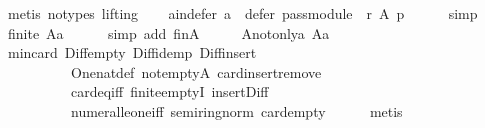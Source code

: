 \begin{isabellebody}
\ {\isacharparenleft}{\kern0pt}metis\ {\isacharparenleft}{\kern0pt}no{\isacharunderscore}{\kern0pt}types{\isacharcomma}{\kern0pt}\ lifting{\isacharparenright}{\kern0pt}{\isacharparenright}{\kern0pt}\isanewline
\ \ \isamarkupfalse%
\ a{\isacharunderscore}{\kern0pt}in{\isacharunderscore}{\kern0pt}defer{\isacharcolon}{\kern0pt}\ {\isachardoublequoteopen}a\ {\isasymin}\ defer\ {\isacharparenleft}{\kern0pt}pass{\isacharunderscore}{\kern0pt}module\ {}\ r{\isacharparenright}{\kern0pt}\ A\ p{\isachardoublequoteclose}\isanewline
\ \ \ \ \isamarkupfalse%
\ simp\isanewline
\ \ \isamarkupfalse%
\ {\isachardoublequoteopen}finite\ {\isacharparenleft}{\kern0pt}A{\isacharminus}{\kern0pt}{\isacharbraceleft}{\kern0pt}a{\isacharbraceright}{\kern0pt}{\isacharparenright}{\kern0pt}{\isachardoublequoteclose}\isanewline
\ \ \ \ \isamarkupfalse%
\ {\isacharparenleft}{\kern0pt}simp\ add{\isacharcolon}{\kern0pt}\ finA{\isacharparenright}{\kern0pt}\isanewline
\ \ \isamarkupfalse%
\ \isamarkupfalse%
\ A{\isacharunderscore}{\kern0pt}not{\isacharunderscore}{\kern0pt}only{\isacharunderscore}{\kern0pt}a{\isacharcolon}{\kern0pt}\ {\isachardoublequoteopen}A{\isacharminus}{\kern0pt}{\isacharbraceleft}{\kern0pt}a{\isacharbraceright}{\kern0pt}\ {\isasymnoteq}\ {\isacharbraceleft}{\kern0pt}{\isacharbraceright}{\kern0pt}{\isachardoublequoteclose}\isanewline
\ \ \ \ \isamarkupfalse%
\ min{\isacharunderscore}{\kern0pt}{}{\isacharunderscore}{\kern0pt}card\ Diff{\isacharunderscore}{\kern0pt}empty\ Diff{\isacharunderscore}{\kern0pt}idemp\ Diff{\isacharunderscore}{\kern0pt}insert{}\isanewline
\ \ \ \ \ \ \ \ \ \ One{\isacharunderscore}{\kern0pt}nat{\isacharunderscore}{\kern0pt}def\ not{\isacharunderscore}{\kern0pt}empty{\isacharunderscore}{\kern0pt}A\ card{\isachardot}{\kern0pt}insert{\isacharunderscore}{\kern0pt}remove\isanewline
\ \ \ \ \ \ \ \ \ \ card{\isacharunderscore}{\kern0pt}eq{\isacharunderscore}{\kern0pt}{}{\isacharunderscore}{\kern0pt}iff\ finite{\isachardot}{\kern0pt}emptyI\ insert{\isacharunderscore}{\kern0pt}Diff\isanewline
\ \ \ \ \ \ \ \ \ \ numeral{\isacharunderscore}{\kern0pt}le{\isacharunderscore}{\kern0pt}one{\isacharunderscore}{\kern0pt}iff\ semiring{\isacharunderscore}{\kern0pt}norm{\isacharparenleft}{\kern0pt}{}{}{\isacharparenright}{\kern0pt}\ card{\isachardot}{\kern0pt}empty\isanewline
\ \ \ \ \isamarkupfalse%
\ metis\isanewline
\ \ \isamarkupfalse%

\end{isabellebody}
